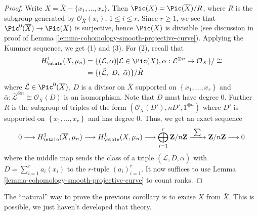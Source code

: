 \begin{proof}
Write $X = \overline{X} - \{ x_1, \ldots, x_r\}$. Then
$\Pic(X) = \Pic(\overline{X})/ R$, where $R$ is the subgroup generated by
$\mathcal{O}_{\overline{X}}(x_i)$, $1 \leq i \leq r$.
Since $r \geq 1$, we see that $\Pic^0(\overline{X}) \to \Pic(X)$
is surjective, hence $\Pic(X)$ is divisible (see discussion in proof
of Lemma \ref{lemma-cohomology-smooth-projective-curve}).
Applying the Kummer sequence, we get (1) and (3). For (2), recall
that
\begin{align*}
H_\etale^1(X, \mu_n)
& =
\{(\mathcal L, \alpha) | \mathcal L \in \Pic(X),
\alpha : \mathcal{L}^{\otimes n} \to \mathcal{O}_X\}/\cong \\
& =
\{(\bar{\mathcal L},\ D,\ \bar \alpha)\}/\tilde{R}
\end{align*}
where $\bar{\mathcal L} \in \Pic^0(\overline{X})$, $D$
is a divisor on $\overline{X}$ supported on $\left\{x_1, \ldots, x_r\right\}$
and
$ \bar{\alpha}: \bar{\mathcal L}^{\otimes n} \cong \mathcal{O}_{\bar{X}}(D)$
is an isomorphism.
Note that $D$ must have degree 0. Further $\tilde{R}$ is the subgroup of
triples of the form $(\mathcal{O}_{\overline{X}}(D'), n D', 1^{\otimes n})$
where
$D'$ is supported on $\left\{x_1, \ldots, x_r\right\}$ and has degree 0. Thus,
we get an exact sequence
$$
0 \longrightarrow
H_\etale^1(\overline{X}, \mu_n) \longrightarrow
H_\etale^1(X, \mu_n) \longrightarrow
\bigoplus_{i = 1}^r \mathbf{Z}/n\mathbf{Z}
\xrightarrow{\ \sum\ }
\mathbf{Z}/n\mathbf{Z} \longrightarrow 0
$$
where the middle map sends the class of a triple
$(\bar{ \mathcal L}, D, \bar \alpha)$ with $D = \sum_{i = 1}^r a_i (x_i)$
to the $r$-tuple $(a_i)_{i = 1}^r$. It now suffices to use
Lemma \ref{lemma-cohomology-smooth-projective-curve}
to count ranks.
\end{proof}

\begin{remark}
\label{remark-natural-proof}
The ``natural'' way to prove the previous corollary is to excise $X$ from $\bar
X$. This is possible, we just haven't developed that theory.
\end{remark}

